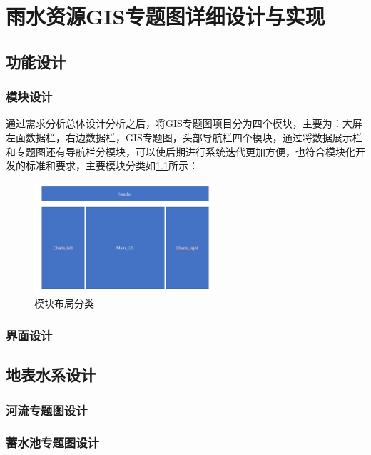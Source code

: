 
\chapter{雨水资源GIS专题图详细设计与实现}

\section{功能设计}

\subsection{模块设计}
通过需求分析总体设计分析之后，将GIS专题图项目分为四个模块，主要为：大屏左面数据栏，右边数据栏，GIS专题图，头部导航栏四个模块，通过将数据展示栏和专题图还有导航栏分模块，可以使后期进行系统迭代更加方便，也符合模块化开发的标准和要求，主要模块分类如\ref{fig:module}所示：

\begin{figure}[!htb]%
	\centering
	\includegraphics[width=0.60\textwidth]{figs/main.png}
	\caption{模块布局分类}
	\label{fig:module}
\end{figure}

\subsection{界面设计}


\section{地表水系设计}

\subsection{河流专题图设计}
\subsection{蓄水池专题图设计}
